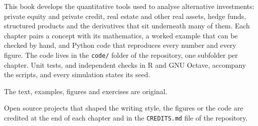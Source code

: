 This book develops the quantitative tools used to analyse alternative investments: private equity and
private credit, real estate and other real assets, hedge funds, structured products and the derivatives that sit
underneath many of them. Each chapter pairs a concept with its mathematics, a worked example that can be checked
by hand, and Python code that reproduces every number and every figure. The code lives in the
\texttt{code/} folder of the repository, one subfolder per chapter. Unit tests, and independent checks in R and GNU
Octave, accompany the scripts, and every simulation states its seed.

The text, examples, figures and exercises are original.

Open source projects that shaped the writing style, the figures or the code are credited at the end of each
chapter and in the \texttt{CREDITS.md} file of the repository.
